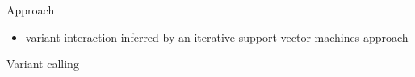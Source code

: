\documentclass[final]{beamer}
\newlength{\onecolwid}
\begin{document}
\begin{frame}[t]
\begin{columns}[t]
\begin{column}{\onecolwid}
\begin{block}{Approach}
{\begin{itemize}
          \item variant interaction inferred by an iterative support vector machines approach
        \end{itemize}
       }
       \end{block}
       \begin{block}{Variant calling}
    \end{block}
   \end{column}

\end{columns}
\end{frame}
\end{document}
